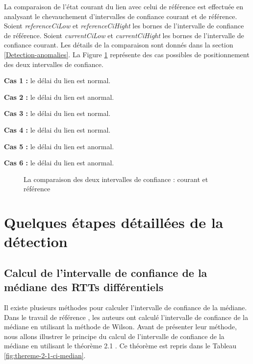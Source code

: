 La comparaison de l'état courant du lien avec celui de référence est effectuée en analysant le chevauchement d'intervalles de confiance  courant et de référence.  Soient 
 \textit{referenceCiLow} et \textit{referenceCiHight}  les bornes de l'intervalle de confiance de référence. Soient  \textit{currentCiLow} et \textit{currentCiHight}  les bornes de l'intervalle de confiance courant. Les détails de la comparaison sont donnés dans la section \ref{Detection-anomalies}.
La Figure 	\ref{fig:intervals-comparaison} représente des cas possibles de positionnement des deux intervalles de confiance.

\textbf{Cas 1 :} le délai du lien est normal.

\textbf{Cas 2 :} le délai du lien est anormal.

\textbf{Cas 3 :} le délai du lien est normal.

\textbf{Cas 4 :} le délai du lien est normal.

\textbf{Cas 5 :} le délai du lien est anormal.

\textbf{Cas 6 :} le délai du lien est anormal.


\begin{figure}[h]
	\centering
	\captionsetup{justification=centering}
	\resizebox{\textwidth}{!}{
		
	}
	\caption{La comparaison des deux intervalles de confiance : courant et référence }
	\label{fig:intervals-comparaison}
\end{figure}



\section{Quelques étapes détaillées de la détection}

\subsection{Calcul de l'intervalle de confiance de la médiane des RTTs différentiels} \label{conf-inter-section-exemple}

Il existe plusieurs méthodes pour calculer l'intervalle de confiance de la médiane. Dans le travail de référence \cite{DBLP:journals/corr/FontugneAPB16}, les auteurs ont calculé l'intervalle de confiance de la médiane en utilisant la méthode de Wilson. Avant de présenter leur méthode, nous allons illustrer le principe du calcul de l'intervalle de confiance de la médiane en utilisant le théorème  2.1  \cite{leboudec2010performance}. Ce théorème est repris dans le Tableau \ref{fig:thereme-2-1-ci-median}.

